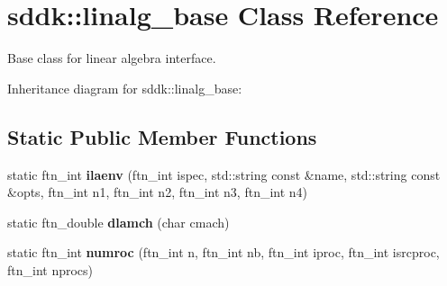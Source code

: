 \hypertarget{classsddk_1_1linalg__base}{}\section{sddk\+:\+:linalg\+\_\+base Class Reference}
\label{classsddk_1_1linalg__base}


Base class for linear algebra interface.  




Inheritance diagram for sddk\+:\+:linalg\+\_\+base\+:
\subsection*{Static Public Member Functions}
\begin{DoxyCompactItemize}
\item 
\hypertarget{classsddk_1_1linalg__base_a53888f8da1bca37ca5570904f1d30a88}{}static ftn\+\_\+int {\bfseries ilaenv} (ftn\+\_\+int ispec, std\+::string const \&name, std\+::string const \&opts, ftn\+\_\+int n1, ftn\+\_\+int n2, ftn\+\_\+int n3, ftn\+\_\+int n4)\label{classsddk_1_1linalg__base_a53888f8da1bca37ca5570904f1d30a88}

\item 
\hypertarget{classsddk_1_1linalg__base_a2f82143fa7c1a980b3116f39ce24439d}{}static ftn\+\_\+double {\bfseries dlamch} (char cmach)\label{classsddk_1_1linalg__base_a2f82143fa7c1a980b3116f39ce24439d}

\item 
\hypertarget{classsddk_1_1linalg__base_a730e721fbd92b23c6f96e5af9ff25be6}{}static ftn\+\_\+int {\bfseries numroc} (ftn\+\_\+int n, ftn\+\_\+int nb, ftn\+\_\+int iproc, ftn\+\_\+int isrcproc, ftn\+\_\+int nprocs)\label{classsddk_1_1linalg__base_a730e721fbd92b23c6f96e5af9ff25be6}


\end{DoxyCompactItemize}
